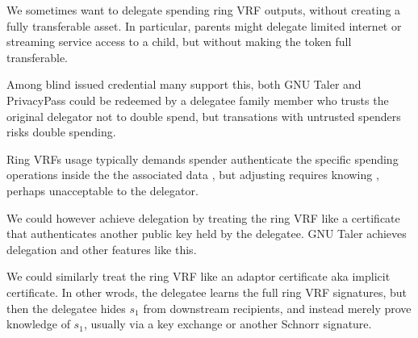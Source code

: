 We sometimes want to delegate spending ring VRF outputs, without
creating a fully transferable asset.  In particular, parents might
delegate limited internet or streaming service access to a child,
but without making the token full transferable.

Among blind issued credential many support this, both
GNU Taler \cite{taler} and PrivacyPass \cite{PrivacyPass} could
be redeemed by a delegatee family member who trusts the original
delegator not to double spend, but transations with untrusted spenders
risks double spending.  

Ring VRFs usage typically demands spender authenticate the specific
spending operations inside the the associated data \aux, but adjusting
\aux requires knowing \sk, perhaps unacceptable to the delegator.

We could however achieve delegation by treating the ring VRF like a
certificate that authenticates another public key held by the delegatee.
GNU Taler achieves delegation and other features like this.

We could similarly treat the ring VRF like an adaptor certificate aka
implicit certificate.  In other wrods, the delegatee learns the full
ring VRF signatures, but then the delegatee hides $s_1$ from downstream
recipients, and instead merely prove knowledge of $s_1$, usually via
a key exchange or another Schnorr signature.

